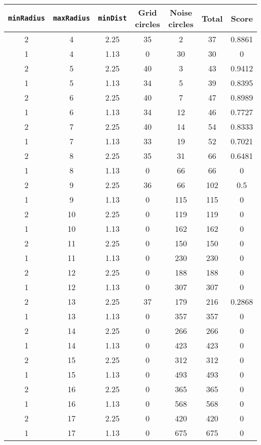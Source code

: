 \documentclass[letterpaper, 12pt]{article}
\begin{document}
\begin{longtable}{|c|c|c|c|c|c|c|}
\hline
\textbf{\texttt{minRadius}} & \textbf{\texttt{maxRadius}} & \textbf{\texttt{minDist}} & \textbf{Grid circles} & \textbf{Noise circles} & \textbf{Total} & \textbf{Score} \\
\hline
2 & 4 & 2.25 & 35 & 2 & 37 & 0.8861 \\
\hline
1 & 4 & 1.13 & 0 & 30 & 30 & 0 \\
\hline
2 & 5 & 2.25 & 40 & 3 & 43 & 0.9412 \\
\hline
1 & 5 & 1.13 & 34 & 5 & 39 & 0.8395 \\
\hline
2 & 6 & 2.25 & 40 & 7 & 47 & 0.8989 \\
\hline
1 & 6 & 1.13 & 34 & 12 & 46 & 0.7727 \\
\hline
2 & 7 & 2.25 & 40 & 14 & 54 & 0.8333 \\
\hline
1 & 7 & 1.13 & 33 & 19 & 52 & 0.7021 \\
\hline
2 & 8 & 2.25 & 35 & 31 & 66 & 0.6481 \\
\hline
1 & 8 & 1.13 & 0 & 66 & 66 & 0 \\
\hline
2 & 9 & 2.25 & 36 & 66 & 102 & 0.5 \\
\hline
1 & 9 & 1.13 & 0 & 115 & 115 & 0 \\
\hline
2 & 10 & 2.25 & 0 & 119 & 119 & 0 \\
\hline
1 & 10 & 1.13 & 0 & 162 & 162 & 0 \\
\hline
2 & 11 & 2.25 & 0 & 150 & 150 & 0 \\
\hline
1 & 11 & 1.13 & 0 & 230 & 230 & 0 \\
\hline
2 & 12 & 2.25 & 0 & 188 & 188 & 0 \\
\hline
1 & 12 & 1.13 & 0 & 307 & 307 & 0 \\
\hline
2 & 13 & 2.25 & 37 & 179 & 216 & 0.2868 \\
\hline
1 & 13 & 1.13 & 0 & 357 & 357 & 0 \\
\hline
2 & 14 & 2.25 & 0 & 266 & 266 & 0 \\
\hline
1 & 14 & 1.13 & 0 & 423 & 423 & 0 \\
\hline
2 & 15 & 2.25 & 0 & 312 & 312 & 0 \\
\hline
1 & 15 & 1.13 & 0 & 493 & 493 & 0 \\
\hline
2 & 16 & 2.25 & 0 & 365 & 365 & 0 \\
\hline
1 & 16 & 1.13 & 0 & 568 & 568 & 0 \\
\hline
2 & 17 & 2.25 & 0 & 420 & 420 & 0 \\
\hline
1 & 17 & 1.13 & 0 & 675 & 675 & 0 \\

\end{longtable}
\end{document}

